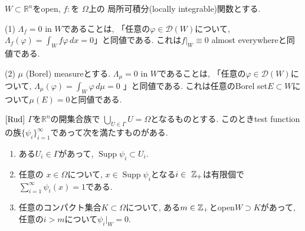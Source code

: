 \begin{ex}
\label{ex-H-19}
\(W \subset \mathbb{R}^n\)をopen,  \(f:\)を \(\Omega\)上の 局所可積分(locally integrable)関数とする.

(1) \(\Lambda_f = 0 \text{ in } W\)であることは, 「任意の$\varphi \in \mathcal{D}(W)$について, 
\( \Lambda_f(\varphi) = \int_W f \varphi \, dx= 0 \)」と同値である. 
これは\( f|_W \equiv 0 \) almost everywhereと同値である. 

(2) \(\mu \) (Borel) measureとする.   
\(\Lambda_\mu = 0 \text{ in } W\)であることは, 「任意の$\varphi \in \mathcal{D}(W)$について, 
\(\Lambda_\mu(\varphi) = \int_W \varphi \, d\mu = 0 \) 」と同値である. 
これは任意のBorel set$E \subset W$について\(\mu(E)=0\)と同値である. 
\end{ex}

\begin{tcolorbox}[mybox]
\begin{thm}{$\cite[Thm 6.20]{Rud}$}
\label{thm-H-20}%
\(\Gamma\)を\(\mathbb{R}^n\)の開集合族で
\(\bigcup_{U \in \Gamma} U = \Omega\)となるものとする. 
このときtest functionの族\(\{\psi_i\}_{i=1}^\infty\)であって次を満たすものがある.  
\begin{enumerate}[label=$(\alph*)$]
\item  ある$U_i \in \Gamma$があって, \(\operatorname{Supp}\psi_i \subset U_i \).
\item 任意の \(x \in \Omega\)について,  $x \in \operatorname{Supp}\psi_i $となる$i \in\ \mathbb{Z}_+$は有限個で
\(\sum_{i=1}^\infty \psi_i(x) = 1\)である. 
\item 任意のコンパクト集合\(K \subset \Omega \)について, ある\(m \in \mathbb{Z}_+\)とopen\(W \supset K\)があって,  
任意の$i > m$について\(\psi_i |_W = 0 \).  
\end{enumerate}
\end{thm}
\end{tcolorbox}


